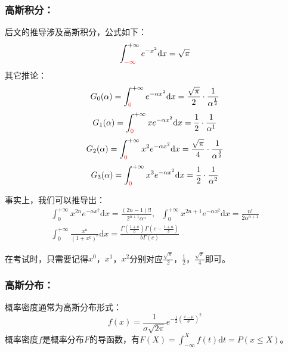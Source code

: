 \documentclass[zihao=-4,UTF8]{report}
\begin{document}
\subsubsection{高斯积分：}
后文的推导涉及高斯积分，公式如下：
\begin{equation}
    \int_{\textcolor{red}{-\infty}}^{+\infty}e^{-x^2}\mathrm{d}x = \sqrt{\pi}
\end{equation}
其它推论：
\begin{equation}
    G_0(\alpha) = \int_{\textcolor{red}{0}}^{+\infty} e^{-\alpha x^2}\mathrm{d}x = \frac{\sqrt{\pi }}{2}\cdot \frac{1}{\alpha^{\frac{1}{2}}}
\end{equation}
\begin{equation}
    G_1(\alpha) = \int_{\textcolor{red}{0}}^{+\infty} xe^{-\alpha x^2}\mathrm{d}x = \frac{1}{2}\cdot \frac{1}{\alpha^1}
\end{equation}
\begin{equation}
    G_2(\alpha) = \int_{\textcolor{red}{0}}^{+\infty} x^2e^{-\alpha x^2}\mathrm{d}x = \frac{\sqrt{\pi }}{4}\cdot \frac{1}{\alpha^{\frac{3}{2}}}
\end{equation}
\begin{equation}
    G_3(\alpha) = \int_{\textcolor{red}{0}}^{+\infty} x^3e^{-\alpha x^2}\mathrm{d}x = \frac{1}{2}\cdot \frac{1}{\alpha^2}
\end{equation}\par 
{\color{gray}\small 事实上，我们可以推导出：
\begin{gather*}
    \int_{0}^{+\infty }x^{2n}e^{-\alpha x^2}\mathrm{d}x = \frac{(2n-1)!!}{2^{n+1}\alpha^n},\ \ \ \int_{0}^{+\infty} x^{2n+1}e^{-\alpha x^2}\mathrm{d}x = \frac{n!}{2\alpha^{n+1}}\\
    \int_{0}^{+\infty } \frac{x^a}{(1+x^b)^c}\mathrm{d}x = \frac{\Gamma(\frac{1+a}{b})\Gamma(c-\frac{1+a}{b})}{b\Gamma(c)}
\end{gather*}\par
在考试时，只需要记得$x^0$，$x^1$，$x^2$分别对应$\frac{\sqrt{\pi}}{2}$，$\frac{1}{2}$，$\frac{\sqrt{ \pi}}{4}$即可。
}
\subsubsection{高斯分布：}
概率密度通常为高斯分布形式：
\begin{equation}
    f(x) = \frac{1}{\sigma\sqrt{2\pi }}e^{-\frac{1}{2}\left(\frac{x-\mu }{\sigma}\right)^2}
\end{equation}
{\color{gray}\small 概率密度$f$是概率分布$F$的导函数，有$F(X) = \int_{-\infty}^{X} f(t)\mathrm{d}t = P(x \le X)$。}
\end{document}
